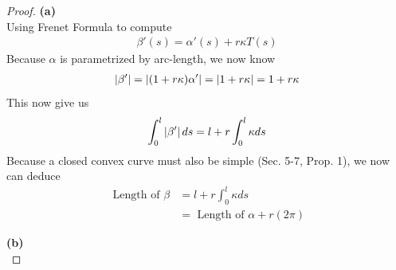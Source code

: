 \documentclass{report}
\begin{document}
\begin{proof}
\textbf{(a)}\\

Using Frenet Formula to compute 
\begin{align*}
\beta '(s)=\alpha '(s)+r\kappa  T(s)
\end{align*}
Because $\alpha $ is parametrized by arc-length, we now know 
\begin{align*}
  \left|\beta '\right|=\left|(1+r\kappa)\alpha '\right|=\left|1+r\kappa \right|=1+ r\kappa
\end{align*}
This now give us 
\begin{align*}
  \int_0^l \left|\beta '\right| ds= l + r \int_0^l \kappa ds
\end{align*}
Because a closed convex curve must also be simple (Sec. 5-7, Prop. 1), we now can deduce 
\begin{align*}
\text{ Length of  }\beta &=l + r \int_0^l \kappa ds\\
&=\text{ Length of }\alpha +r(2\pi)
\end{align*}

\textbf{(b)}\\


\end{proof}
\end{document}
